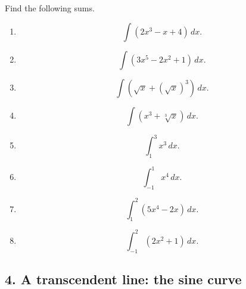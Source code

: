 \documentclass[polutonikogreek,english,twoside,openright]{article}
\begin{document}
\label{pset5} Find the following sums.

\begin{enumerate}

\item $$\int\!(2x^3 - x + 4)\,dx.$$

\item $$\int\!(3x^5 -2x^2 + 1) \,dx.$$

\item $$\int\!(\sqrt{x} + (\sqrt{x})^3)\,dx.$$

\item $$\int\!(x^3 + \sqrt[3]{x})\,dx.$$

\item $$\int_1^3 \!x^3\,dx.$$

\item $$\int_{-1}^1 x^4\,dx.$$

\item $$\int_{1}^2\!(5x^4 - 2x)\,dx.$$

\item $$\int_{-1}^2\!(2x^2 +1)\,dx.$$




\end{enumerate}







\subsection*{4. A transcendent line: the sine curve}
\end{document}
